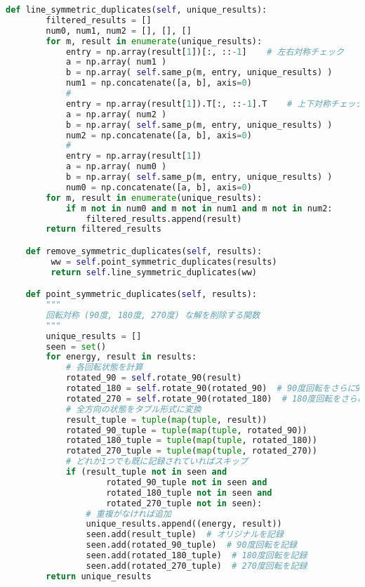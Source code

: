 \documentclass[uplatex,dvipdfmx,a4paper,11pt,oneside,openany]{jsbook}
\begin{document}
\begin{lstlisting}[language=Python]
    def line_symmetric_duplicates(self, unique_results):
        filtered_results = []
        num0, num1, num2 = [], [], []
        for m, result in enumerate(unique_results):
            entry = np.array(result[1])[:, ::-1]    # 左右対称チェック
            a = np.array( num1 )
            b = np.array( self.same_p(m, entry, unique_results) )
            num1 = np.concatenate([a, b], axis=0)
            #
            entry = np.array(result[1]).T[:, ::-1].T    # 上下対称チェック
            a = np.array( num2 )
            b = np.array( self.same_p(m, entry, unique_results) )
            num2 = np.concatenate([a, b], axis=0)
            #
            entry = np.array(result[1])
            a = np.array( num0 )
            b = np.array( self.same_p(m, entry, unique_results) )
            num0 = np.concatenate([a, b], axis=0)
        for m, result in enumerate(unique_results):
            if m not in num0 and m not in num1 and m not in num2:
                filtered_results.append(result)
        return filtered_results

    def remove_symmetric_duplicates(self, results):
         ww = self.point_symmetric_duplicates(results)
         return self.line_symmetric_duplicates(ww)

    def point_symmetric_duplicates(self, results):
        """
        回転対称 (90度, 180度, 270度) な解を削除する関数
        """
        unique_results = []
        seen = set()
        for energy, result in results:
            # 各回転状態を計算
            rotated_90 = self.rotate_90(result)
            rotated_180 = self.rotate_90(rotated_90)  # 90度回転をさらに90度回転で180度
            rotated_270 = self.rotate_90(rotated_180)  # 180度回転をさらに90度回転で270度
            # 全方向の状態をタプル形式に変換
            result_tuple = tuple(map(tuple, result))
            rotated_90_tuple = tuple(map(tuple, rotated_90))
            rotated_180_tuple = tuple(map(tuple, rotated_180))
            rotated_270_tuple = tuple(map(tuple, rotated_270))
            # どれか1つでも既に記録されていればスキップ
            if (result_tuple not in seen and
                    rotated_90_tuple not in seen and
                    rotated_180_tuple not in seen and
                    rotated_270_tuple not in seen):
                # 重複がなければ追加
                unique_results.append((energy, result))
                seen.add(result_tuple)  # オリジナルを記録
                seen.add(rotated_90_tuple)  # 90度回転を記録
                seen.add(rotated_180_tuple)  # 180度回転を記録
                seen.add(rotated_270_tuple)  # 270度回転を記録
        return unique_results


\end{lstlisting}
\end{document}
